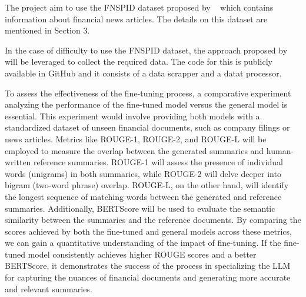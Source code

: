 The project aim to use the FNSPID dataset proposed by ~\cite{Dong2024} which contains information about financial news
articles.
The details on this dataset are mentioned in Section 3.

In the case of difficulty to use the FNSPID dataset, the approach proposed by ~\cite{Dong2024} will be leveraged to
collect the required data.
The code for this is publicly available in GitHub and it consists of a data scrapper and a datat processor.

To assess the effectiveness of the fine-tuning process, a comparative experiment analyzing the performance of the
fine-tuned model versus the general model is essential.
This experiment would involve providing both models with a standardized dataset of unseen financial documents, such as
company filings or news articles.
Metrics like ROUGE-1, ROUGE-2, and ROUGE-L will be employed to measure the overlap between the generated summaries and
human-written reference summaries.
ROUGE-1 will assess the presence of individual words (unigrams) in both summaries, while ROUGE-2 will delve deeper into
bigram (two-word phrase) overlap.
ROUGE-L, on the other hand, will identify the longest sequence of matching words between the generated and reference summaries.
Additionally, BERTScore will be used to evaluate the semantic similarity between the summaries and the reference documents.
By comparing the scores achieved by both the fine-tuned and general models across these metrics, we can gain a
quantitative understanding of the impact of fine-tuning.
If the fine-tuned model consistently achieves higher ROUGE scores and a better BERTScore, it demonstrates the success of
the process in specializing the LLM for capturing the nuances of financial documents and generating more accurate and
relevant summaries.

